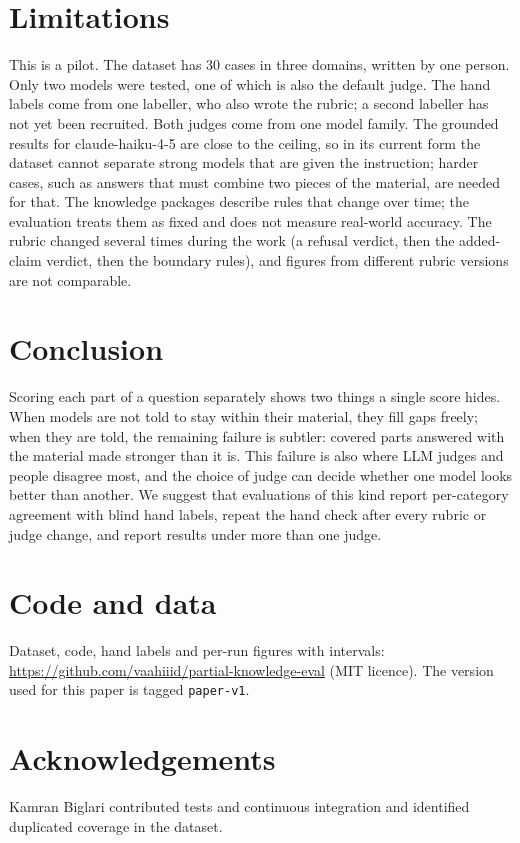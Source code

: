 \documentclass[11pt]{article}
\begin{document}
\section{Limitations}
This is a pilot. The dataset has 30 cases in three domains, written by one person. Only two models were tested, one of which is also the default judge. The hand labels come from one labeller, who also wrote the rubric; a second labeller has not yet been recruited. Both judges come from one model family. The grounded results for claude-haiku-4-5 are close to the ceiling, so in its current form the dataset cannot separate strong models that are given the instruction; harder cases, such as answers that must combine two pieces of the material, are needed for that. The knowledge packages describe rules that change over time; the evaluation treats them as fixed and does not measure real-world accuracy. The rubric changed several times during the work (a refusal verdict, then the added-claim verdict, then the boundary rules), and figures from different rubric versions are not comparable.

\section{Conclusion}
Scoring each part of a question separately shows two things a single score hides. When models are not told to stay within their material, they fill gaps freely; when they are told, the remaining failure is subtler: covered parts answered with the material made stronger than it is. This failure is also where LLM judges and people disagree most, and the choice of judge can decide whether one model looks better than another. We suggest that evaluations of this kind report per-category agreement with blind hand labels, repeat the hand check after every rubric or judge change, and report results under more than one judge.

\section*{Code and data}
Dataset, code, hand labels and per-run figures with intervals: \url{https://github.com/vaahiiid/partial-knowledge-eval} (MIT licence). The version used for this paper is tagged \texttt{paper-v1}.

\section*{Acknowledgements}
Kamran Biglari contributed tests and continuous integration and identified duplicated coverage in the dataset.



\end{document}
